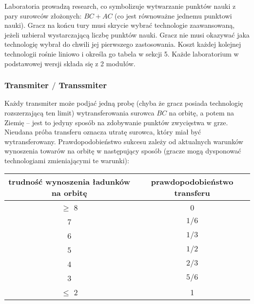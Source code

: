 \documentclass[11pt,a4paper]{article}
\begin{document}
Laboratoria prowadzą research, co symbolizuje wytwarzanie punktów nauki z pary surowców złożonych: $BC + AC$ (co jest równoważne jednemu punktowi nauki). Gracz na końcu tury musi skrycie wybrać technologie zaawansowaną, jeżeli uzbierał wystarczającą liczbę punktów nauki. Gracz nie musi okazywać jaka technologię wybrał do chwili jej pierwszego zastosowania. Koszt każdej kolejnej technologii rośnie liniowo i określa go tabela w sekcji 5. Każde laboratorium w podstawowej wersji składa się z 2 modułów. 

\subsubsection{Transmiter $/$ Transsmiter}

Każdy transmiter może podjać jedną probę (chyba że gracz posiada technologię rozszerzającą ten limit) wytransferowania surowca $BC$ na orbitę, a potem na Ziemię -- jest to jedyny sposób na zdobywanie punktów zwycięstwa w grze. Nieudana próba transferu oznacza utratę surowca, który miał być wytransferowany. Prawdopodobieństwo sukcesu zależy od aktualnych warunków wynoszenia towarów na orbitę w następujący sposób (gracze mogą dysponować technologiami zmieniającymi te warunki):
\begin{center}
  \begin{tabular}{| c | c |}
    \hline
    \textbf{trudność wynoszenia ładunków na orbitę} & \textbf{prawdopodobieństwo transferu}\\
    \hline
     $\ge$ 8 & 0 \\
    \hline
    7 & $1/6$ \\
    \hline
    6 & $1/3$ \\
    \hline
    5 & $1/2$ \\
    \hline
    4 & $2/3$ \\
    \hline
    3 & $5/6$ \\
    \hline
     $\le$ 2  & 1 \\
    \hline
  \end{tabular}
\end{center}
\end{document}
